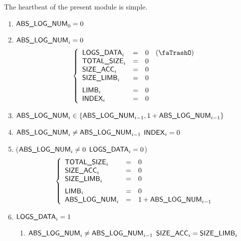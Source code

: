 The heartbeat of the present module is simple.
\begin{enumerate}
	\item $\textsf{ABS\_LOG\_NUM}_{0} = 0$
	\item \If $\textsf{ABS\_LOG\_NUM}_{i} = 0$ \Then
		\[
			\left\{ \begin{array}{lclr}
				\logLogsData_{i}   & = & 0 & (\trash) \\
				\logDataSize_{i}   & = & 0 \\
				\cumulSize_{i}     & = & 0 \\
				\limbSize_{i}      & = & 0 \vspace{2mm} \\
				\limb_{i}          & = & 0 \\
				\index_{i}         & = & 0 \\
			\end{array} \right.
		\]
	\item $\textsf{ABS\_LOG\_NUM}_{i} \in \{ \textsf{ABS\_LOG\_NUM}_{i - 1}, 1 + \textsf{ABS\_LOG\_NUM}_{i - 1} \}$
	\item \If $\textsf{ABS\_LOG\_NUM}_{i} \neq \textsf{ABS\_LOG\_NUM}_{i - 1}$ \Then $\textsf{INDEX}_{i} = 0$
	\item \If \Big($\textsf{ABS\_LOG\_NUM}_{i} \neq 0$ \et $\textsf{LOGS\_DATA}_{i} = 0$\Big) \Then
		\[
			\left\{ \begin{array}{lcl}
				\logDataSize_{i}   & = & 0 \\
				\cumulSize_{i}     & = & 0 \\
				\limbSize_{i}      & = & 0 \vspace{2mm} \\
				\limb_{i}          & = & 0 \\
				\absLogNum_{i}     & = & 1 + \absLogNum_{i - 1} \\
			\end{array} \right.
		\]
	\item \If $\textsf{LOGS\_DATA}_{i} = 1$ \Then
		\begin{enumerate}
			\item \If $\textsf{ABS\_LOG\_NUM}_{i} \neq \textsf{ABS\_LOG\_NUM}_{i - 1}$ \Then $\textsf{SIZE\_ACC}_{i} = \textsf{SIZE\_LIMB}_{i}$


\end{enumerate}
\end{enumerate}
